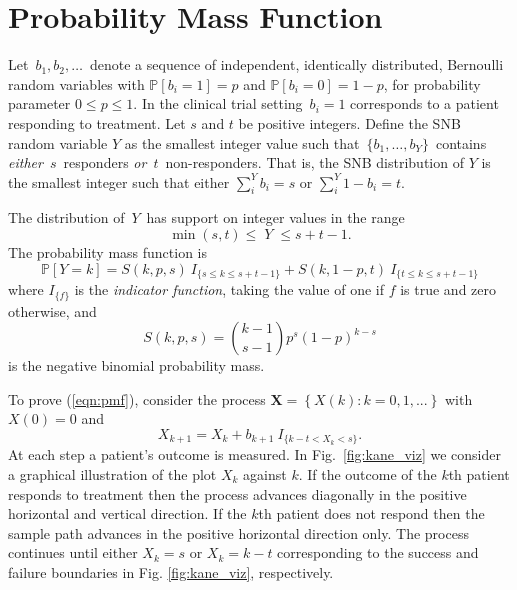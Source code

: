 \documentclass[review]{elsarticle}
\begin{document}
\section{Probability Mass Function}
\label{notation.section}

Let $\,b_1, b_2, \ldots \,$ denote a sequence of independent, identically
distributed, Bernoulli random variables with $\mathbb{P}[b_i=1]=p$ and
$\mathbb{P}[b_i = 0] = 1-p$, for
probability parameter $0\leq p \leq 1$. In the clinical trial setting
$\,b_i = 1$ corresponds to a patient responding to treatment.  
Let $s$ and $t$ be positive integers.  Define the SNB random
variable $Y$ as the smallest
integer value such that $\,\{b_1, \ldots , b_Y\}\,$ contains {\em either}
$\,s\,$ responders {\em or} $\,t\,$ non-responders. That is, the SNB 
distribution of $Y$ is the smallest integer such that either
$\sum_i^Y b_i = s$ or $\sum_i^Y 1-b_i = t$.

The distribution of $\,Y\,$ has support on integer values in the range
\begin{equation*}               
     \min(s,t) \leq \; Y \;\leq s+t-1  \label{range.y.eq}.
\end{equation*}
The probability mass function is
\begin{equation} \label{eqn:pmf}
\mathbb{P} [Y=k] = S(k, p, s) \ I_{\{s \leq k \leq s+t-1\}} + 
  S(k, 1-p, t) \ I_{\{ t \leq k \leq s+t-1 \}}
\end{equation}
where $I_{\{f\}}$ is the {\em indicator function}, taking the value 
of one if $f$ is true and zero otherwise, and
\begin{equation} \label{eqn:N}
S(k, p, s) = {k-1 \choose s-1} p^s (1-p)^{k-s} 
\end{equation}
is the negative binomial probability mass.

To prove (\ref{eqn:pmf}), consider the
process $\mathbf{X} = \left\{X(k) : k = 0,1,... \right\}$
with $X(0)=0$ and
\begin{equation*} \label{eqn:proc}
X_{k+1} = X_k + b_{k+1} \ I_{\{ k-t < X_k < s\}}.
\end{equation*}
At each step a patient's outcome is measured. In Fig.~\ref{fig:kane_viz} 
we consider a graphical illustration of the plot $X_k$ against
$k$. If the outcome of the $k$th patient responds to treatment then the process 
advances diagonally in the positive horizontal and vertical direction. 
If the $k$th patient does not respond
then the sample path advances in the positive horizontal direction only. The
process continues until either $X_k = s$ or $X_k = k-t$ corresponding to the
success and failure boundaries in Fig. \ref{fig:kane_viz}, respectively.
\end{document}
